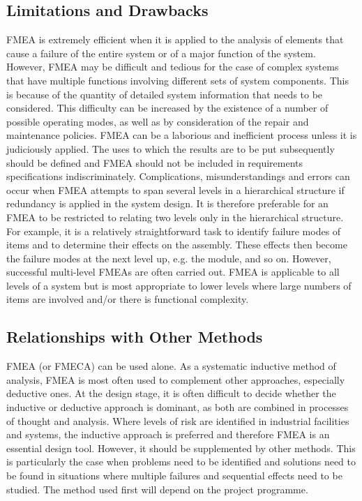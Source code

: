 \documentclass[./dissertation.tex]{subfiles}
\begin{document}
\subsection{Limitations and Drawbacks}
FMEA is extremely efficient when it is applied to the analysis of elements that cause a failure of the entire system or of a major function of the system. However, FMEA may be difficult and tedious for the case of complex systems that have multiple functions involving different sets of system components. This is because of the quantity of detailed system information that needs to be considered. This difficulty can be increased by the existence of a number of possible operating modes, as well as by consideration of the repair and maintenance policies. FMEA can be a laborious and inefficient process unless it is judiciously applied. The uses to which the results are to be put subsequently should be defined and FMEA should not be included in requirements specifications indiscriminately. Complications, misunderstandings and errors can occur when FMEA attempts to span several levels in a hierarchical structure if redundancy is applied in the system design. It is therefore preferable for an FMEA to be restricted to relating two levels only in the hierarchical structure. For example, it is a relatively straightforward task to identify failure modes of items and to determine their effects on the assembly. These effects then become the failure modes at the next level up, e.g. the module, and so on. However, successful multi-level FMEAs are often carried out. FMEA is applicable to all levels of a system but is most appropriate to lower levels where large numbers of items are involved and/or there is functional complexity.

\subsection{Relationships with Other Methods}
FMEA (or FMECA) can be used alone. As a systematic inductive method of analysis, FMEA is most often used to complement other approaches, especially deductive ones. At the design stage, it is often difficult to decide whether the inductive or deductive approach is dominant, as both are combined in processes of thought and analysis. Where levels of risk are identified in industrial facilities and systems, the inductive approach is preferred and therefore FMEA is an essential design tool. However, it should be supplemented by other methods. This is particularly the case when problems need to be identified and solutions need to be found in situations where multiple failures and sequential effects need to be studied. The method used first will depend on the project programme.
\end{document}
